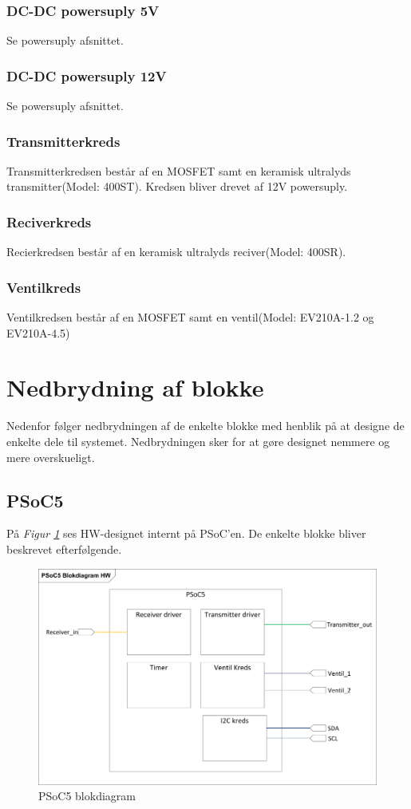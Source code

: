 \subsubsection{DC-DC powersuply 5V}
Se powersuply afsnittet.
\subsubsection{DC-DC powersuply 12V}
Se powersuply afsnittet.
\subsubsection{Transmitterkreds}
Transmitterkredsen består af en MOSFET samt en keramisk ultralyds transmitter(Model: 400ST). Kredsen bliver drevet af 12V powersuply. 
\subsubsection{Reciverkreds}
Recierkredsen består af en keramisk ultralyds reciver(Model: 400SR).
\subsubsection{Ventilkreds}
Ventilkredsen består af en MOSFET samt en ventil(Model: EV210A-1.2 og EV210A-4.5)
\newpage
\section{Nedbrydning af blokke}
Nedenfor følger nedbrydningen af de enkelte blokke med henblik på at designe de enkelte dele til systemet. Nedbrydningen sker for at gøre designet nemmere og mere overskueligt.
\subsection{PSoC5}
På \textit{Figur \ref{fig:PSoCBlok}} ses HW-designet internt på PSoC'en. De enkelte blokke bliver beskrevet efterfølgende.
\begin{figure}[H]
\centering
\includegraphics[width=.85\textwidth]{billeder/PSoCBlock}
\caption{PSoC5 blokdiagram}
\label{fig:PSoCBlok}
\end{figure}
